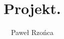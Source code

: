\title{Projekt.}
\author{Paweł Rzońca}
\graphicspath{{/home/galeon/Labor/czas/main/images/}}

\renewcommand{\figurename}{Rys.}
\renewcommand{\tablename}{Tab.}
\renewcommand{\abstractname}{Abstrakt}


\renewcommand{\d}{\text{d}}
\newcommand{\D}{\text{D}}


\theoremstyle{definition}
\newtheorem{definition}{Definicja}

\theoremstyle{theorem}
\newtheorem{theorem}{Twierdzenie}
